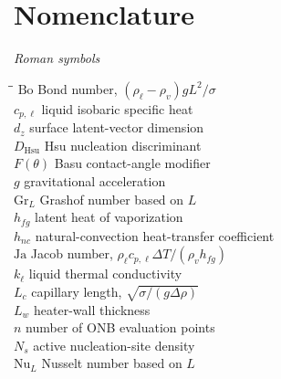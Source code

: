 \section*{Nomenclature}

\noindent\textit{Roman symbols}
\begin{tabbing}
\hspace{2.4cm}\=\hspace{10cm}\=\kill
$\mathrm{Bo}$      \> Bond number, $(\rho_{\ell}-\rho_v)gL^2/\sigma$        \> [---] \\
$c_{p,\ell}$       \> liquid isobaric specific heat                       \> [\si{J/(kg.K)}] \\
$d_z$              \> surface latent-vector dimension                     \> [---] \\
$D_{\mathrm{Hsu}}$ \> Hsu nucleation discriminant                         \> [---] \\
$F(\theta)$        \> Basu contact-angle modifier                         \> [---] \\
$g$                \> gravitational acceleration                          \> [\si{m/s^2}] \\
$\mathrm{Gr}_L$    \> Grashof number based on $L$                         \> [---] \\
$h_{fg}$           \> latent heat of vaporization                         \> [\si{J/kg}] \\
$h_{nc}$           \> natural-convection heat-transfer coefficient        \> [\si{W/(m^2.K)}] \\
$\mathrm{Ja}$      \> Jacob number, $\rho_{\ell}c_{p,\ell}\Delta T/(\rho_v h_{fg})$ \> [---] \\
$k_{\ell}$         \> liquid thermal conductivity                         \> [\si{W/(m.K)}] \\
$L_c$              \> capillary length, $\sqrt{\sigma/(g\Delta\rho)}$     \> [m] \\
$L_w$              \> heater-wall thickness                               \> [m] \\
$n$                \> number of ONB evaluation points                     \> [---] \\
$N_s$              \> active nucleation-site density                      \> [\si{1/cm^2}] \\
$\mathrm{Nu}_L$    \> Nusselt number based on $L$                         \> [---] \\

\end{tabbing}
